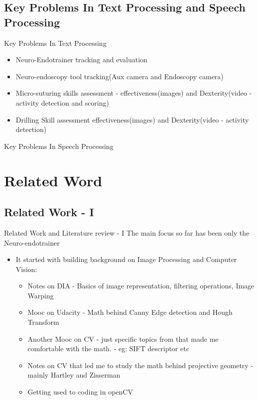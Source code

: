 \documentclass{beamer}
\begin{document}
\subsection{Key Problems In Text Processing and Speech Processing}

\begin{frame}{Key Problems In Text Processing}

\begin{itemize}
\item Neuro-Endotrainer tracking and evaluation
\item Neuro-endoscopy tool tracking(Aux camera and Endoscopy camera)
\item  Micro-suturing skills assessment - effectiveness(images) and Dexterity(video - activity detection and scoring)
\item Drilling Skill assessment effectiveness(images) and Dexterity(video - activity detection)
\end{itemize}

\end{frame}

\begin{frame}{Key Problems In Speech Processing}
\end{frame}

\section{Related Word}
\subsection{Related Work - I}
\begin{frame}{Related Work and Literature review - I}
\Large The main focus so far has been only the Neuro-endotrainer
\begin{itemize}
\item It started with building background on Image Processing and Computer Vision:
\begin{itemize}
\item \large Notes on DIA - Basics of image representation, filtering operations, Image Warping
\item \large Mooc on Udacity - Math behind Canny Edge detection and Hough Transform
\item \large Another Mooc on CV - just specific topics from that made me comfortable with the math. - eg: SIFT descriptor etc
\item \large Notes on CV that led me to study the math behind
projective geometry - mainly Hartley and Zisserman
\item \large Getting used to coding in openCV
\end{itemize}
\end{itemize}
\end{frame}
\end{document}
